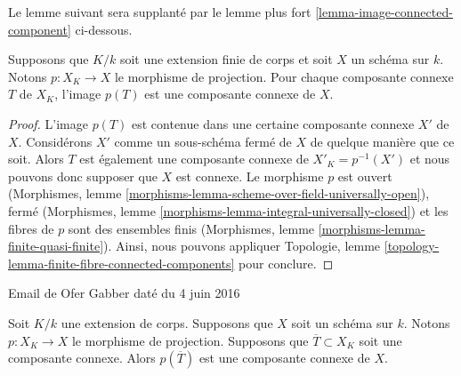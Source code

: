 \noindent
Le lemme suivant sera supplanté par le lemme plus
fort \ref{lemma-image-connected-component} ci-dessous.

\begin{lemma}
\label{lemma-image-connected-component-finite-extension}
Supposons que $K/k$ soit une extension finie de corps et
soit $X$ un schéma sur $k$. Notons $p : X_K \to X$ le
morphisme de projection. Pour chaque composante connexe $T$
de $X_K$, l'image $p(T)$ est une composante connexe de $X$.
\end{lemma}

\begin{proof}
L'image $p(T)$ est contenue dans une certaine composante
connexe $X'$ de $X$. Considérons $X'$ comme un
sous-schéma fermé de $X$ de quelque manière que ce soit.
Alors $T$ est également une composante connexe de $X'_K =
p^{-1}(X')$ et nous pouvons donc supposer que $X$ est
connexe. Le morphisme $p$ est ouvert (Morphismes, lemme
\ref{morphisms-lemma-scheme-over-field-universally-open}),
fermé (Morphismes, lemme
\ref{morphisms-lemma-integral-universally-closed}) et les fibres de
$p$ sont des ensembles finis (Morphismes, lemme
\ref{morphisms-lemma-finite-quasi-finite}). Ainsi, nous pouvons appliquer
Topologie, lemme \ref{topology-lemma-finite-fibre-connected-components} pour conclure.
\end{proof}

\begin{lemma}[Gabber]
\label{lemma-image-connected-component}
\begin{reference}
Email de Ofer Gabber daté du 4 juin 2016
\end{reference}
Soit $K/k$ une extension de corps. Supposons que $X$
soit un schéma sur $k$. Notons $p : X_K \to X$ le morphisme de
projection. Supposons que $\overline{T} \subset X_K$ soit une
composante connexe. Alors $p(\overline{T})$ est une composante connexe de $X$.
\end{lemma}

